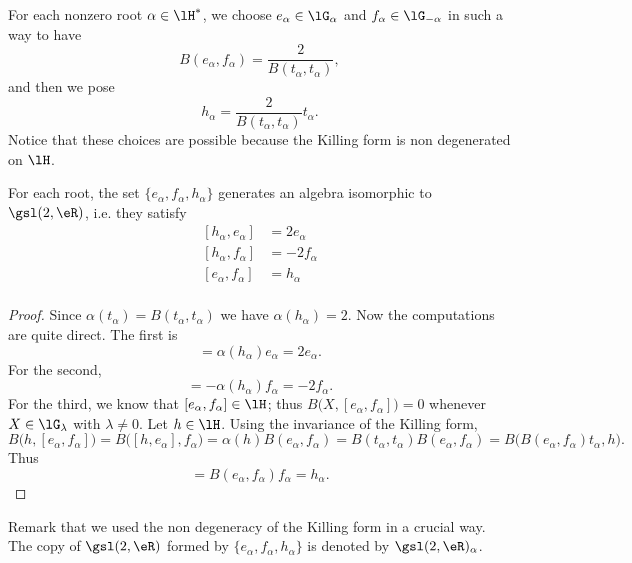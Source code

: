 For each nonzero root \( \alpha\in\lH^*\), we choose \( e_{\alpha}\in\lG_{\alpha}\) and \( f_{\alpha}\in\lG_{-\alpha}\) in such a way to have
\begin{equation}
	B(e_{\alpha},f_{\alpha})=\frac{ 2 }{ B(t_{\alpha},t_{\alpha}) },
\end{equation}
and then we pose
\begin{equation}
	h_{\alpha}=\frac{ 2 }{ B(t_{\alpha},t_{\alpha}) }t_{\alpha}.
\end{equation}
Notice that these choices are possible because the Killing form is non degenerated on \( \lH\).

\begin{proposition} \label{PropWEzZYzC}
	For each root, the set $\{ e_{\alpha},f_{\alpha},h_{\alpha} \}$ generates an algebra isomorphic to $\gsl(2,\eR)$, i.e. they satisfy
	\begin{subequations}
		\begin{align}
			[h_{\alpha},e_{\alpha}] & =2e_{\alpha}  \\
			[h_{\alpha},f_{\alpha}] & =-2f_{\alpha} \\
			[e_{\alpha},f_{\alpha}] & =h_{\alpha}   \\
		\end{align}
	\end{subequations}
\end{proposition}

\begin{proof}
	Since \( \alpha(t_{\alpha})=B(t_{\alpha},t_{\alpha})\) we have \( \alpha(h_{\alpha})=2\). Now the computations are quite direct. The first is
	\begin{equation}
		[h_{\alpha},e_{\alpha}]=\alpha(h_{\alpha})e_{\alpha}=2e_{\alpha}.
	\end{equation}
	For the second,
	\begin{equation}
		[h_{\alpha},f_{\alpha}]=-\alpha(h_{\alpha})f_{\alpha}=-2f_{\alpha}.
	\end{equation}
	For the third, we know that \( [e_{\alpha},f_{\alpha}]\in\lH\); thus \( B\big( X,[e_{\alpha},f_{\alpha}] \big)=0\) whenever \( X\in\lG_{\lambda}\) with \( \lambda\neq 0\). Let \( h\in\lH\). Using the invariance of the Killing form,
	\begin{equation}
		B\big( h,[e_{\alpha},f_{\alpha}] \big)=B\big( [h,e_{\alpha}],f_{\alpha} \big)=\alpha(h)B(e_{\alpha},f_{\alpha})=B(t_{\alpha},t_{\alpha})B(e_{\alpha},f_{\alpha})=B\big( B(e_{\alpha},f_{\alpha})t_{\alpha},h \big).
	\end{equation}
	Thus
	\begin{equation}
		[e_{\alpha},f_{\alpha}]=B(e_{\alpha},f_{\alpha})f_{\alpha}=h_{\alpha}.
	\end{equation}
\end{proof}
Remark that we used the non degeneracy of the Killing form in a crucial way. The copy of \( \gsl(2,\eR)\) formed by \( \{ e_{\alpha},f_{\alpha},h_{\alpha} \}\) is denoted by $\gsl(2,\eR)_{\alpha}$.


